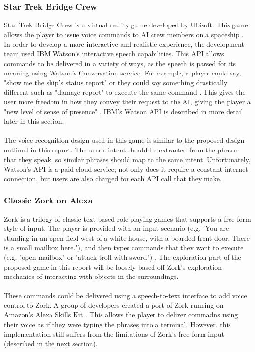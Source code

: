 \documentclass[12pt]{article}
\begin{document}
\subsubsection{Star Trek Bridge Crew}

Star Trek Bridge Crew is a virtual reality game developed by Ubisoft. This game allows the player to issue voice commands to AI crew members on a spaceship \cite{RefWorks:29}. In order to develop a more interactive and realistic experience, the development team used IBM Watson's interactive speech capabilities. This API allows commands to be delivered in a variety of ways, as the speech is parsed for its meaning using Watson's Conversation service. For example, a player could say, "show me the ship's status report" or they could say something drastically different such as "damage report" to execute the same command \cite{RefWorks:25}. This gives the user more freedom in how they convey their request to the AI, giving the player a "new level of sense of presence" \cite{RefWorks:26}. IBM's Watson API is described in more detail later in this section.
\\
\\
The voice recognition design used in this game is similar to the proposed design outlined in this report. The user's intent should be extracted from the phrase that they speak, so similar phrases should map to the same intent. Unfortunately, Watson's API is a paid cloud service; not only does it require a constant internet connection, but users are also charged for each API call that they make.

\subsubsection{Classic Zork on Alexa}

Zork is a trilogy of classic text-based role-playing games that supports a free-form style of input. The player is provided with an input scenario (e.g. "You are standing in an open field west of a white house, with a boarded front door. There is a small mailbox here."), and then types commands that they want to execute (e.g. "open mailbox" or "attack troll with sword") \cite{RefWorks:35}. The exploration part of the proposed game in this report will be loosely based off Zork's exploration mechanics of interacting with objects in the surroundings.
\\
\\
These commands could be delivered using a speech-to-text interface to add voice control to Zork. A group of developers created a port of Zork running on Amazon's Alexa Skills Kit \cite{RefWorks:35}. This allows the player to deliver commadns using their voice as if they were typing the phrases into a terminal. However, this implementation still suffers from the limitations of Zork's free-form input (described in the next section).
\end{document}
